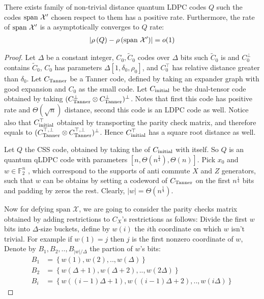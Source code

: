 \documentclass[manuscript,screen,review]{acmart}
\begin{document}
\begin{claim}
  There exists family of non-trivial distance quantum LDPC codes $Q$ such the codes $\text{span }\mathcal{X}^\prime$ chosen respect to them has a positive rate. Furthermore, the rate of $\text{span }\mathcal{X}^\prime$ is a asymptotically converges to $Q$ rate:
  \begin{equation*}
    \begin{split}
      \left| \rho\left(Q\right) - \rho\left(\text{span }\mathcal{X}^\prime\right) \right| = o(1)
    \end{split}
  \end{equation*}
\end{claim}
\begin{proof}
  Let $\Delta$ be a constant integer, $C_{0},\tilde{C}_{0}$ codes over $\Delta$ bits such $\tilde{C}_{0}$ is \trig and $C^{\perp}_{0}$ contains $\tilde{C}_{0}$, $C_{0}$ has parameters $\Delta[1,\delta_{0},\rho_{0}]$, and $C_{0}^\top$ has relative distance greater than $\delta_{0}$. Let $C_{\text{Tanner}}$ be a Tanner code, defined by taking an expander graph with good expansion and $C_{0}$ as the small code. Let $C_{\text{initial}}$ be the dual-tensor code obtained by taking $(C_{\text{Tanner}}^\perp \otimes C_{\text{Tanner}}^\perp )^\perp$. Notes that first this code has positive rate and $\Theta(\sqrt{n})$ distance, second this code is an LDPC code as well. Notice also that $C_{\text{initial}}^{\top}$ obtained by transporting the parity check matrix, and therefore equals to  $(C_{\text{Tanner}}^{\top, \perp} \otimes C_{\text{Tanner}}^{\top, \perp} )^\perp$. Hence $C_{\text{initial}}^{\top}$ has a square root distance as well.

  Let $Q$ the CSS code, obtained by taking the \Hyp of $C_{\text{initial}}$ with itself. So $Q$ is an quantum qLDPC code with parameters $[n, \Theta(n^{\frac{1}{4}}), \Theta(n)]$. Pick $x_{0}$ and $w \in \mathbb{F}_{2}^{n}$ , which correspond to the supports of anti commute $X$ and $Z$ generators, such that $w$ can be obtains by setting a codeword of $C_{\text{Tanner}}$ on the first $n^{\frac{1}{4}}$ bits and padding by zeros the rest. Clearly, $|w| = \Theta(n^{\frac{1}{4}})$.

  Now for defying $\text{span }\mathcal{X}$, we are going to consider the parity checks matrix obtained by adding restrictions to $C_{X}$'s restrictions as follows: Divide the first $w$ bits into $\Delta$-size buckets, define by $w(i)$ the $i$th coordinate on which $w$ isn't trivial. For example if $w(1)=j$ then $j$ is the first nonzero coordinate of $w$, Denote by $B_{1},B_2,.., B_{|w|/\Delta}$ the partion of $w$'s bits: 
  \begin{equation*}
    \begin{split}
      B_{1} &= \left\{w(1), w(2), ..,w(\Delta)\right\}\\
      B_{2} &= \left\{w(\Delta + 1), w(\Delta + 2), ..,w(2\Delta) \right\}\\
      B_{i} &= \left\{w((i-1)\Delta + 1), w((i-1)\Delta + 2), ..,w(i\Delta) \right\}
    \end{split}
  \end{equation*}


\end{proof}
\end{document}
